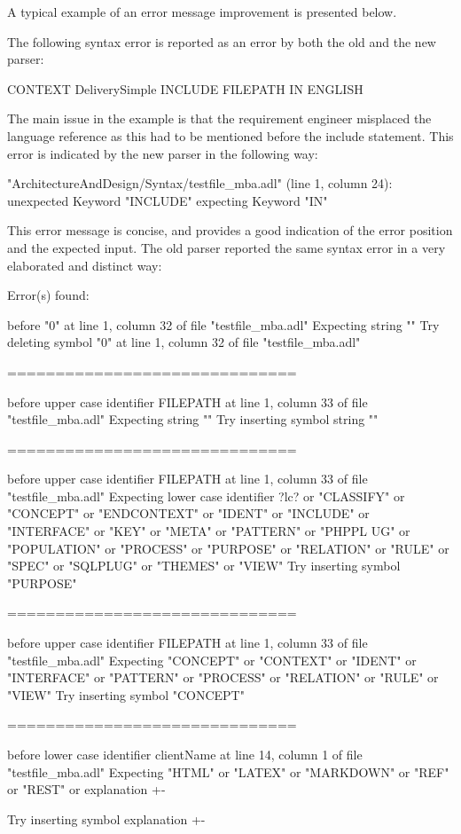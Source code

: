A typical example of an error message improvement is presented below.

The following syntax error is reported as an error by both the old and the new parser:
\begin{adl}
   CONTEXT DeliverySimple INCLUDE FILEPATH IN ENGLISH
\end{adl}

The main issue in the example is that the requirement engineer misplaced the language reference as this had to be mentioned before the include statement.
This error is indicated by the new parser in the following way:
\begin{error}
   "ArchitectureAndDesign/Syntax/testfile_mba.adl" (line 1, column 24):
   unexpected Keyword "INCLUDE"
   expecting Keyword "IN"
\end{error}

This error message is concise, and provides a good indication of the error position and the expected input.
The old parser reported the same syntax error in a very elaborated and distinct way:
\begin{error}
   Error(s) found:

   before "0" at line 1, column 32 of file "testfile_mba.adl"
   Expecting string ""
   Try deleting symbol "0" at line 1, column 32 of file "testfile_mba.adl"

   ==============================

   before upper case identifier FILEPATH at line 1, column 33 of file "testfile_mba.adl"
   Expecting string ""
   Try inserting symbol string ""

   ==============================

   before upper case identifier FILEPATH at line 1, column 33 of file "testfile_mba.adl"
   Expecting lower case identifier ?lc? or "CLASSIFY" or "CONCEPT" or "ENDCONTEXT" or "IDENT" or "INCLUDE" or "INTERFACE" or "KEY" or "META" or "PATTERN" or "PHPPL UG" or "POPULATION" or "PROCESS" or "PURPOSE" or "RELATION" or "RULE" or "SPEC" or "SQLPLUG" or "THEMES" or "VIEW"
   Try inserting symbol "PURPOSE"

   ==============================

   before upper case identifier FILEPATH at line 1, column 33 of file "testfile_mba.adl"
   Expecting "CONCEPT" or "CONTEXT" or "IDENT" or "INTERFACE" or "PATTERN" or "PROCESS" or "RELATION" or "RULE" or "VIEW"
   Try inserting symbol "CONCEPT"

   ==============================

   before lower case identifier clientName at line 14, column 1 of file "testfile_mba.adl"
   Expecting "HTML" or "LATEX" or "MARKDOWN" or "REF" or "REST" or explanation {+-}

   Try inserting symbol explanation {+-}
\end{error}


